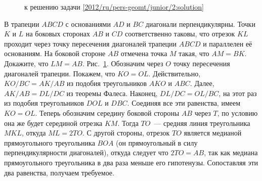 \ifsolution
\begin{figure}\centering
    \caption{к решению задачи \ref{2012/ru/pers-geomt/junior/2:solution}}
    \label{2012/ru/pers-geomt/junior/2:solution:fig}
\end{figure}%
\fi %

\problem
В трапеции $ABCD$ с основаниями $AD$ и $BC$ диагонали перпендикулярны.
Точки $K$ и $L$ на боковых сторонах $AB$ и $CD$ соответственно таковы, что
отрезок $KL$ проходит через точку пересечения диагоналей трапеции $ABCD$ и
параллелен её основаниям.
На боковой стороне $AB$ отмечена точка $M$ такая, что $AM = BK$.
Докажите, что $LM = AB$.
\solution
\label{2012/ru/pers-geomt/junior/2:solution}%
Рис.~\ref{2012/ru/pers-geomt/junior/2:solution:fig}.
Обозначим через $O$ точку пересечения диагоналей трапеции.
Покажем, что $KO = OL$.
Действительно, $KO / BC = AK / AB$ из подобия треугольников
$AKO$ и $ABC$.
Далее, $AK / AB = DL / DC$ из теоремы Фалеса.
Наконец, $DL / DC = OL / BC$, на этот раз из подобия
треугольников $DOL$ и $DBC$.
Соединяя все эти равенства, имеем $KO = OL$.
Теперь обозначим середину боковой стороны $AB$ через $T$, по условию она же
будет серединой отрезка $KM$.
Тогда $TO$~--- средняя линия треугольника $MKL$, откуда $ML = 2 TO$.
С другой стороны, отрезок $TO$ является медианой прямоугольного треугольника
$BOA$
(он прямоугольный в силу перпендикулярности диагоналей),
откуда следует что $2 TO = AB$, так как медиана прямоугольного треугольника в
два раза меньше его гипотенузы.
Сопоставляя эти два равенства, получаем требуемое.
\endproblem
